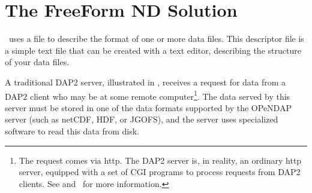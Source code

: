 



  
  

\section{The FreeForm ND Solution}

\ffnd\ uses a  file to describe the format
of one or more data files.  This descriptor file is a simple text file
that can be created with a text editor, describing the structure of
your data files.  

A traditional DAP2 server, illustrated in ,
receives a request for data from a DAP2 client who may be at some
remote computer\footnote{The request comes via http. The DAP2 server
  is, in reality, an ordinary http server, equipped with a set of CGI
  programs to process requests from DAP2 clients.
  See  and \DODSuser\ for more information.}.
The data served by this server must be stored in one of the data
formats supported by the OPeNDAP server (such as netCDF, HDF, or
JGOFS), and the server uses specialized software to read this data
from disk.

